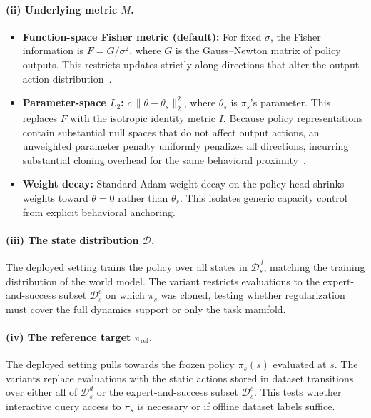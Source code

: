 \documentclass{article} %
\begin{document}
\paragraph{(ii) Underlying metric $M$.}
\begin{itemize}
\item \textbf{Function-space Fisher metric (default):} For fixed $\sigma$, the Fisher information is $F = G/\sigma^2$, where $G$ is the Gauss--Newton matrix of policy outputs. This restricts updates strictly along directions that alter the output action distribution~\citep{hinton2015distilling, li2017learning}.
\item \textbf{Parameter-space $L_2$:} $c\,\lVert\theta - \theta_s\rVert_2^2$, where $\theta_s$ is $\pi_s$'s parameter. This replaces $F$ with the isotropic identity metric $I$. Because policy representations contain substantial null spaces that do not affect output actions, an unweighted parameter penalty uniformly penalizes all directions, incurring substantial cloning overhead for the same behavioral proximity~\citep{kirkpatrick2017overcoming}.
\item \textbf{Weight decay:} Standard Adam weight decay on the policy head shrinks weights toward $\theta = 0$ rather than $\theta_s$. This isolates generic capacity control from explicit behavioral anchoring.
\end{itemize}

\paragraph{(iii) The state distribution $\mathcal{D}$.}
The deployed setting trains the policy over all states in $\mathcal{D}^d_s$, matching the training distribution of the world model. The variant restricts evaluations to the expert-and-success subset $\mathcal{D}^e_s$ on which $\pi_s$ was cloned, testing whether regularization must cover the full dynamics support or only the task manifold.

\paragraph{(iv) The reference target $\pi_{\mathrm{ref}}$.}
The deployed setting pulls towards the frozen policy $\pi_s(s)$ evaluated at $s$. The variants replace evaluations with the static actions stored in dataset transitions over either all of $\mathcal{D}^d_s$ or the expert-and-success subset $\mathcal{D}^e_s$. This tests whether interactive query access to $\pi_s$ is necessary or if offline dataset labels suffice.
\end{document}
